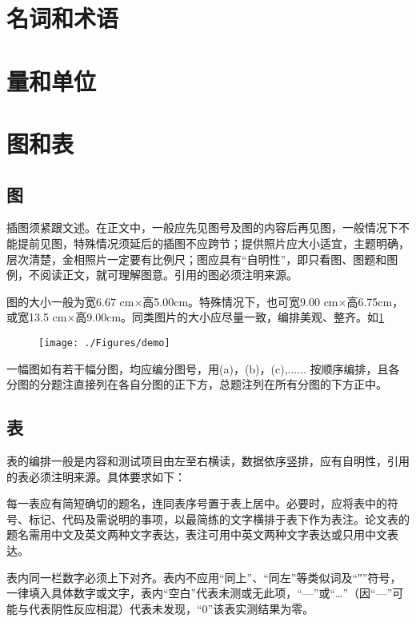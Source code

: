 \section{名词和术语}
\section{量和单位}
\section{图和表}
\subsection{图}
插图须紧跟文述。在正文中，一般应先见图号及图的内容后再见图，一般情况下不能提前见图，特殊情况须延后的插图不应跨节；提供照片应大小适宜，主题明确，层次清楚，金相照片一定要有比例尺；图应具有“自明性”，即只看图、图题和图例，不阅读正文，就可理解图意。引用的图必须注明来源。

图的大小一般为宽6.67 cm×高5.00cm。特殊情况下，也可宽9.00 cm×高6.75cm，或宽13.5 cm×高9.00cm。同类图片的大小应尽量一致，编排美观、整齐。如\cref{fig:demo}
\begin{figure}[H]
    \texttt{[image: ./Figures/demo]}
    \centering
    \label{fig:demo}
\end{figure}
一幅图如有若干幅分图，均应编分图号，用(a)，(b)，(c),...... 按顺序编排，且各分图的分题注直接列在各自分图的正下方，总题注列在所有分图的下方正中。
\subsection{表}
表的编排一般是内容和测试项目由左至右横读，数据依序竖排，应有自明性，引用的表必须注明来源。具体要求如下：

每一表应有简短确切的题名，连同表序号置于表上居中。必要时，应将表中的符号、标记、代码及需说明的事项，以最简练的文字横排于表下作为表注。论文表的题名需用中文及英文两种文字表达，表注可用中英文两种文字表达或只用中文表达。

表内同一栏数字必须上下对齐。表内不应用“同上”、“同左”等类似词及“″”符号，一律填入具体数字或文字，表内“空白”代表未测或无此项，“—”或“…”（因“—”可能与代表阴性反应相混）代表未发现，“0”该表实测结果为零。

